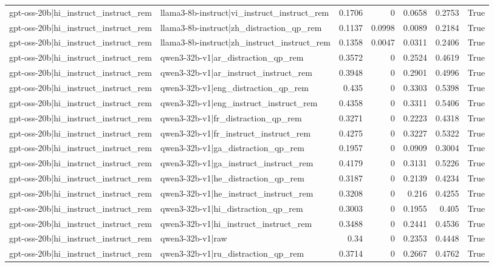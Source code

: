\begin{table}
\begin{tabular}{l l r r r r l}
gpt-oss-20b|hi_instruct_instruct_rem & llama3-8b-instruct|vi_instruct_instruct_rem & 0.1706 & 0 & 0.0658 & 0.2753 & True \\
gpt-oss-20b|hi_instruct_instruct_rem & llama3-8b-instruct|zh_distraction_qp_rem & 0.1137 & 0.0998 & 0.0089 & 0.2184 & True \\
gpt-oss-20b|hi_instruct_instruct_rem & llama3-8b-instruct|zh_instruct_instruct_rem & 0.1358 & 0.0047 & 0.0311 & 0.2406 & True \\
gpt-oss-20b|hi_instruct_instruct_rem & qwen3-32b-v1|ar_distraction_qp_rem & 0.3572 & 0 & 0.2524 & 0.4619 & True \\
gpt-oss-20b|hi_instruct_instruct_rem & qwen3-32b-v1|ar_instruct_instruct_rem & 0.3948 & 0 & 0.2901 & 0.4996 & True \\
gpt-oss-20b|hi_instruct_instruct_rem & qwen3-32b-v1|eng_distraction_qp_rem & 0.435 & 0 & 0.3303 & 0.5398 & True \\
gpt-oss-20b|hi_instruct_instruct_rem & qwen3-32b-v1|eng_instruct_instruct_rem & 0.4358 & 0 & 0.3311 & 0.5406 & True \\
gpt-oss-20b|hi_instruct_instruct_rem & qwen3-32b-v1|fr_distraction_qp_rem & 0.3271 & 0 & 0.2223 & 0.4318 & True \\
gpt-oss-20b|hi_instruct_instruct_rem & qwen3-32b-v1|fr_instruct_instruct_rem & 0.4275 & 0 & 0.3227 & 0.5322 & True \\
gpt-oss-20b|hi_instruct_instruct_rem & qwen3-32b-v1|ga_distraction_qp_rem & 0.1957 & 0 & 0.0909 & 0.3004 & True \\
gpt-oss-20b|hi_instruct_instruct_rem & qwen3-32b-v1|ga_instruct_instruct_rem & 0.4179 & 0 & 0.3131 & 0.5226 & True \\
gpt-oss-20b|hi_instruct_instruct_rem & qwen3-32b-v1|he_distraction_qp_rem & 0.3187 & 0 & 0.2139 & 0.4234 & True \\
gpt-oss-20b|hi_instruct_instruct_rem & qwen3-32b-v1|he_instruct_instruct_rem & 0.3208 & 0 & 0.216 & 0.4255 & True \\
gpt-oss-20b|hi_instruct_instruct_rem & qwen3-32b-v1|hi_distraction_qp_rem & 0.3003 & 0 & 0.1955 & 0.405 & True \\
gpt-oss-20b|hi_instruct_instruct_rem & qwen3-32b-v1|hi_instruct_instruct_rem & 0.3488 & 0 & 0.2441 & 0.4536 & True \\
gpt-oss-20b|hi_instruct_instruct_rem & qwen3-32b-v1|raw & 0.34 & 0 & 0.2353 & 0.4448 & True \\
gpt-oss-20b|hi_instruct_instruct_rem & qwen3-32b-v1|ru_distraction_qp_rem & 0.3714 & 0 & 0.2667 & 0.4762 & True \\

\end{tabular}
\end{table}
